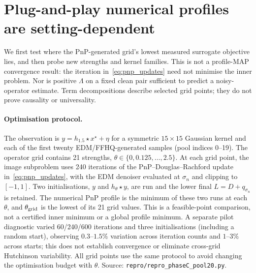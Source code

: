 \documentclass[10pt,journal]{IEEEtran}
\newcommand{\blur}{\star}
\newcommand{\Lam}{\Lambda}
\begin{document}
\section{Plug-and-play numerical profiles are setting-dependent}
\label{sec:overblur}

We first test where the PnP-generated grid's lowest measured surrogate objective lies, and then
probe new strengths and kernel families. This is not a profile-MAP convergence result: the
iteration in~\eqref{eq:pnp_updates} need not minimise the inner problem. Nor is positive
$\Lam$ on a fixed clean pair sufficient to predict a noisy-operator estimate. Term
decompositions describe selected grid points; they do not prove causality or universality.

\paragraph*{Optimisation protocol.}
The observation is $y=h_{1.5}\blur x^\star+\eta$ for a symmetric $15\times15$ Gaussian kernel
and each of the first twenty EDM/FFHQ-generated samples (pool indices 0--19). The operator grid
contains 21 strengths, $\theta\in\{0,0.125,\ldots,2.5\}$. At each grid point, the image
subproblem uses 240 iterations of the PnP--Douglas--Rachford update in~\eqref{eq:pnp_updates},
with the EDM denoiser evaluated at $\sigma_n$ and clipping to $[-1,1]$. Two initialisations,
$y$ and $h_\theta\blur y$, are run and the lower final $L=D+q_{\sigma_n}$ is retained. The
numerical PnP profile is the minimum of these two runs at each $\theta$, and
$\theta_{\rm grid}$ is the lowest of its 21 grid values. This is a feasible-point comparison,
not a certified inner minimum or a global profile minimum. A separate pilot diagnostic varied
60/240/600 iterations and three initialisations (including a random start), observing
$0.3$--$1.5\%$ variation across iteration counts and $1$--$3\%$ across starts; this does not
establish convergence or eliminate cross-grid Hutchinson variability. All grid points use the
same protocol to avoid changing the optimisation budget with $\theta$. Source:
\texttt{repro/repro\_phaseC\_pool20.py}.
\end{document}
